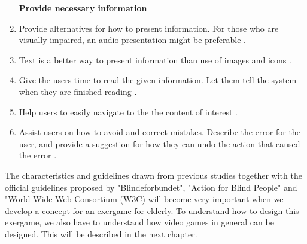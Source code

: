 \begin{enumerate}[{o}.1]
\textbf{Provide necessary information}
\item Provide alternatives for how to present information. For those who are visually impaired, an audio presentation might be preferable \cite{blindeforbundetTekst} \cite{w3cTekst}. 
\item Text is a better way to present information than use of images and icons \cite{w3cTekst}.
\item Give the users time to read the given information. Let them tell the system when they are finished reading \cite{w3cTekst}.  
\item Help users to easily navigate to the the content of interest \cite{w3cTekst}.
\item Assist users on how to avoid and correct mistakes. Describe the error for the user, and provide a suggestion for how they can undo the action that caused the error \cite{w3cTekst}.      
\end{enumerate} 

The characteristics and guidelines drawn from previous studies together with the official guidelines proposed by "Blindeforbundet", "Action for Blind People" and "World Wide Web Consortium (W3C) will become very important  when we develop a concept for an exergame for elderly. To understand how to design this exergame, we also have to understand how video games in general can be designed. This will be described in the next chapter.




